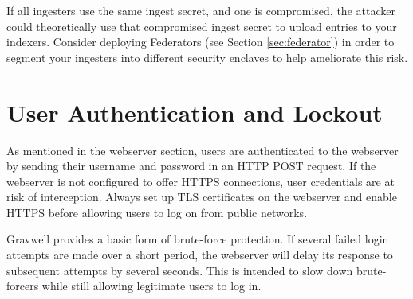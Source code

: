 If all ingesters use the same ingest secret, and one is compromised, the attacker
could theoretically use that compromised ingest secret to upload entries to
your indexers. Consider deploying Federators (see Section \ref{sec:federator}) in
order to segment your ingesters into different security enclaves to help ameliorate this risk.

\section{User Authentication and Lockout}
As mentioned in the webserver section, users are authenticated to the
webserver by sending their username and password in an HTTP POST
request. If the webserver is not configured to offer HTTPS connections,
user credentials are at risk of interception. Always set up TLS
certificates on the webserver and enable HTTPS before allowing users to
log on from public networks.

Gravwell provides a basic form of brute-force protection. If several
failed login attempts are made over a short period, the webserver will
delay its response to subsequent attempts by several seconds. This is
intended to slow down brute-forcers while still allowing legitimate
users to log in.
